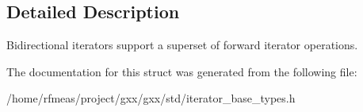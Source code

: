 \subsection{Detailed Description}
Bidirectional iterators support a superset of forward iterator operations. 

The documentation for this struct was generated from the following file\+:\begin{DoxyCompactItemize}
\item 
/home/rfmeas/project/gxx/gxx/std/iterator\+\_\+base\+\_\+types.\+h\end{DoxyCompactItemize}
